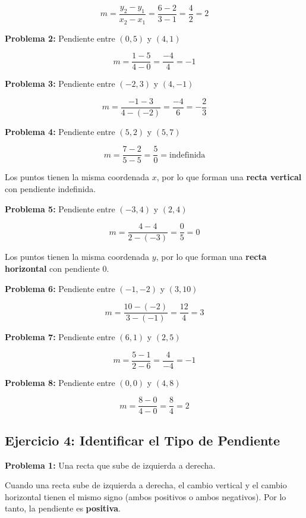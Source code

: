 $$m = \frac{y_2 - y_1}{x_2 - x_1} = \frac{6 - 2}{3 - 1} = \frac{4}{2} = 2$$

\medskip

\textbf{Problema 2:} Pendiente entre $(0, 5)$ y $(4, 1)$

$$m = \frac{1 - 5}{4 - 0} = \frac{-4}{4} = -1$$

\medskip

\textbf{Problema 3:} Pendiente entre $(-2, 3)$ y $(4, -1)$

$$m = \frac{-1 - 3}{4 - (-2)} = \frac{-4}{6} = -\frac{2}{3}$$

\medskip

\textbf{Problema 4:} Pendiente entre $(5, 2)$ y $(5, 7)$

$$m = \frac{7 - 2}{5 - 5} = \frac{5}{0} = \text{indefinida}$$

Los puntos tienen la misma coordenada $x$, por lo que forman una \textbf{recta vertical} con pendiente indefinida.

\medskip

\textbf{Problema 5:} Pendiente entre $(-3, 4)$ y $(2, 4)$

$$m = \frac{4 - 4}{2 - (-3)} = \frac{0}{5} = 0$$

Los puntos tienen la misma coordenada $y$, por lo que forman una \textbf{recta horizontal} con pendiente 0.

\medskip

\textbf{Problema 6:} Pendiente entre $(-1, -2)$ y $(3, 10)$

$$m = \frac{10 - (-2)}{3 - (-1)} = \frac{12}{4} = 3$$

\medskip

\textbf{Problema 7:} Pendiente entre $(6, 1)$ y $(2, 5)$

$$m = \frac{5 - 1}{2 - 6} = \frac{4}{-4} = -1$$

\medskip

\textbf{Problema 8:} Pendiente entre $(0, 0)$ y $(4, 8)$

$$m = \frac{8 - 0}{4 - 0} = \frac{8}{4} = 2$$

\newpage

\subsection*{Ejercicio 4: Identificar el Tipo de Pendiente}

\textbf{Problema 1:} Una recta que sube de izquierda a derecha.

Cuando una recta sube de izquierda a derecha, el cambio vertical y el cambio horizontal tienen el mismo signo (ambos positivos o ambos negativos). Por lo tanto, la pendiente es \textbf{positiva}.

